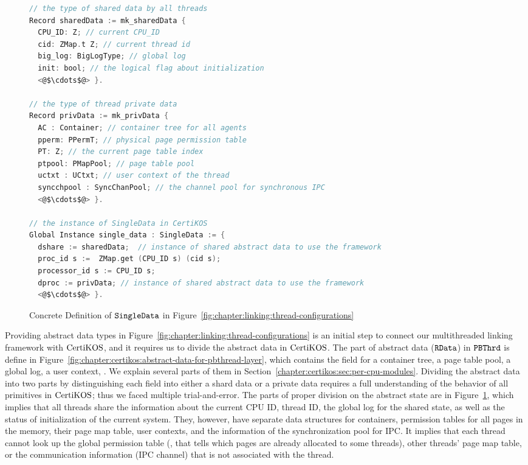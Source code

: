 \begin{figure}
\begin{lstlisting}[language=C]
// the type of shared data by all threads
Record sharedData := mk_sharedData {
  CPU_ID: Z; // current CPU_ID 
  cid: ZMap.t Z; // current thread id
  big_log: BigLogType; // global log
  init: bool; // the logical flag about initialization
  <@$\cdots$@> }.
  
// the type of thread private data
Record privData := mk_privData {
  AC : Container; // container tree for all agents
  pperm: PPermT; // physical page permission table 
  PT: Z; // the current page table index
  ptpool: PMapPool; // page table pool
  uctxt : UCtxt; // user context of the thread
  syncchpool : SyncChanPool; // the channel pool for synchronous IPC
  <@$\cdots$@> }.

// the instance of SingleData in CertiKOS
Global Instance single_data : SingleData := {
  dshare := sharedData;  // instance of shared abstract data to use the framework
  proc_id s :=  ZMap.get (CPU_ID s) (cid s);
  processor_id s := CPU_ID s;
  dproc := privData; // instance of shared abstract data to use the framework
  <@$\cdots$@> }.
\end{lstlisting}
\caption{Concrete Definition of ${\mathrm{\texttt{SingleData}}}$ in Figure~\ref{fig:chapter:linking:thread-configurations}}

\label{fig:chapter:certikos:single-data-of-multithreaded-linking-certikos}
\end{figure}

Providing abstract data types in  Figure~\ref{fig:chapter:linking:thread-configurations} is an initial step 
to connect our multithreaded linking framework with $\mathrm{CertiKOS}$,
and it requires us to divide the abstract data in $\mathrm{CertiKOS}$.
The part of abstract data (${\mathrm{\texttt{RData}}}$) in ${{\mathrm{\texttt{PBThrd}}}}$
is define in Figure~\ref{fig:chapter:certikos:abstract-data-for-pbthread-layer}, 
which contains the field for a container tree, a page table pool, a global log, a user context, \etc.
We explain several parts of them in Section~\ref{chapter:certikos:sec:per-cpu-modules}. 
Dividing the abstract data into two parts by distinguishing 
each field into either a shard data or a private data 
requires a full understanding of the behavior of all primitives in $\mathrm{CertiKOS}$;
thus we faced multiple trial-and-error.
The parts of proper division on the abstract state are in Figure~\ref{fig:chapter:certikos:single-data-of-multithreaded-linking-certikos},
which implies that 
all threads share the information about the current CPU ID, thread ID, the global log for the shared state,
 as well as the status of initialization of the current system. 
 They, however, have separate data structures 
 for containers, permission tables for all pages in the memory, 
 their page map table, user contexts, and the information of the synchronization pool for IPC.
 It implies that 
 each thread cannot look up the global permission table (\ie, that tells which pages are already allocated to some threads),
 other threads' page map table, or the communication information (IPC channel) that is not associated with the thread.

